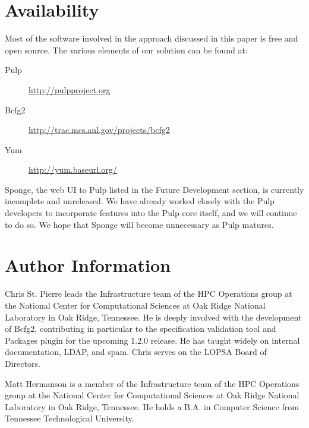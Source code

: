 \section{Availability}
\label{sec:availability}

Most of the software involved in the approach discussed in this paper
is free and open source.  The various elements of our solution can be
found at:

\begin{description}
\item[Pulp] \url{http://pulpproject.org}
\item[Bcfg2] \url{http://trac.mcs.anl.gov/projects/bcfg2}
\item[Yum] \url{http://yum.baseurl.org/}
\end{description}

Sponge, the web UI to Pulp listed in the Future Development section,
is currently incomplete and unreleased.  We have already worked
closely with the Pulp developers to incorporate features into the Pulp
core itself, and we will continue to do so.  We hope that Sponge will
become unnecessary as Pulp matures.

\section{Author Information}
\label{sec:authors}

Chris St. Pierre leads the Infrastructure team of the HPC Operations
group at the National Center for Computational Sciences at Oak Ridge
National Laboratory in Oak Ridge, Tennessee.  He is deeply involved
with the development of Bcfg2, contributing in particular to the
specification validation tool and Packages plugin for the upcoming
1.2.0 release.  He has taught widely on internal documentation, LDAP,
and spam.  Chris serves on the LOPSA Board of Directors.

Matt Hermanson is a member of the Infrastructure team of the HPC
Operations group at the National Center for Computational Sciences at
Oak Ridge National Laboratory in Oak Ridge, Tennessee. He holds a
B.A. in Computer Science from Tennessee Technological University.
